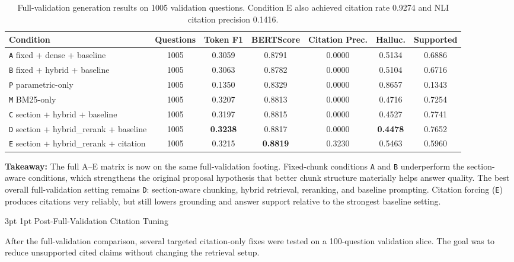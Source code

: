 \documentclass[11pt,letterpaper]{article}
\makeatletter
\renewcommand{\subsection}{\@startsection{subsection}{2}{\z@}%
  {3pt \@plus 1pt}{1pt}%
  {\normalfont\normalsize\itshape}}
\makeatother
\begin{document}
\begin{table}[H]
\centering
\small
\begin{tabular}{@{}lcccccc@{}}
\toprule
\textbf{Condition} & \textbf{Questions} & \textbf{Token F1} & \textbf{BERTScore} & \textbf{Citation Prec.} & \textbf{Halluc.} & \textbf{Supported} \\
\midrule
\texttt{A} fixed + dense + baseline & 1005 & 0.3059 & 0.8791 & 0.0000 & 0.5134 & 0.6886 \\
\texttt{B} fixed + hybrid + baseline & 1005 & 0.3063 & 0.8782 & 0.0000 & 0.5104 & 0.6716 \\
\texttt{P} parametric-only & 1005 & 0.1350 & 0.8329 & 0.0000 & 0.8657 & 0.1343 \\
\texttt{M} BM25-only & 1005 & 0.3207 & 0.8813 & 0.0000 & 0.4716 & 0.7254 \\
\texttt{C} section + hybrid + baseline & 1005 & 0.3197 & 0.8815 & 0.0000 & 0.4527 & 0.7741 \\
\texttt{D} section + hybrid\_rerank + baseline & 1005 & \textbf{0.3238} & 0.8817 & 0.0000 & \textbf{0.4478} & 0.7652 \\
\texttt{E} section + hybrid\_rerank + citation & 1005 & 0.3215 & \textbf{0.8819} & 0.3230 & 0.5463 & 0.5960 \\
\bottomrule
\end{tabular}
\caption{Full-validation generation results on 1005 validation questions. Condition E also achieved citation rate 0.9274 and NLI citation precision 0.1416.}
\end{table}

\textbf{Takeaway:} The full A--E matrix is now on the same full-validation footing. Fixed-chunk conditions \texttt{A} and \texttt{B} underperform the section-aware conditions, which strengthens the original proposal hypothesis that better chunk structure materially helps answer quality. The best overall full-validation setting remains \texttt{D}: section-aware chunking, hybrid retrieval, reranking, and baseline prompting. Citation forcing (\texttt{E}) produces citations very reliably, but still lowers grounding and answer support relative to the strongest baseline setting.

\subsection{Post-Full-Validation Citation Tuning}

After the full-validation comparison, several targeted citation-only fixes were tested on a 100-question validation slice. The goal was to reduce unsupported cited claims without changing the retrieval setup.
\end{document}
